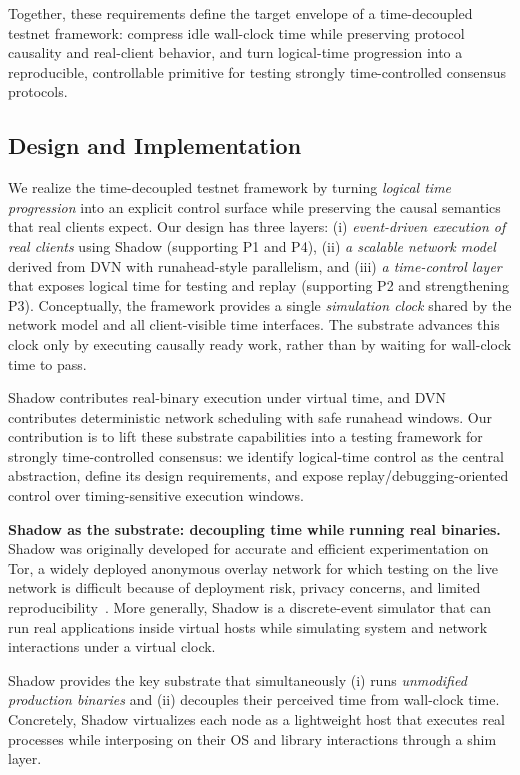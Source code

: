 \smallskip
Together, these requirements define the target envelope of a time-decoupled testnet framework: compress idle wall-clock time while preserving protocol causality and real-client behavior, and turn logical-time progression into a reproducible, controllable primitive for testing strongly time-controlled consensus protocols.
    
  
  
  
\subsection{Design and Implementation}
\label{subsec:edt-impl}

We realize the time-decoupled testnet framework by turning \emph{logical time progression} into an explicit control surface while preserving the causal semantics that real clients expect. Our design has three layers: (i) \emph{event-driven execution of real clients} using Shadow (supporting P1 and P4), (ii) \emph{a scalable network model} derived from DVN with runahead-style parallelism, and (iii) \emph{a time-control layer} that exposes logical time for testing and replay (supporting P2 and strengthening P3).
Conceptually, the framework provides a single \emph{simulation clock} shared by the network model and all client-visible time interfaces. The substrate advances this clock only by executing causally ready work, rather than by waiting for wall-clock time to pass.

Shadow contributes real-binary execution under virtual time, and DVN contributes deterministic network scheduling with safe runahead windows. Our contribution is to lift these substrate capabilities into a testing framework for strongly time-controlled consensus: we identify logical-time control as the central abstraction, define its design requirements, and expose replay/debugging-oriented control over timing-sensitive execution windows.

\smallskip
\noindent\textbf{Shadow as the substrate: decoupling time while running real binaries.}
Shadow was originally developed for accurate and efficient experimentation on Tor, a widely deployed anonymous overlay network for which testing on the live network is difficult because of deployment risk, privacy concerns, and limited reproducibility~\cite{jansen2011shadow}. More generally, Shadow is a discrete-event simulator that can run real applications inside virtual hosts while simulating system and network interactions under a virtual clock.

Shadow provides the key substrate that simultaneously (i) runs \emph{unmodified production binaries} and (ii) decouples their perceived time from wall-clock time. Concretely, Shadow virtualizes each node as a lightweight host that executes real processes while interposing on their OS and library interactions through a shim layer.

